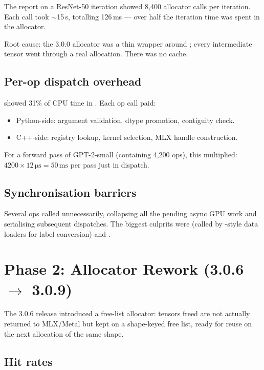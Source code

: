The  report on a ResNet-50 iteration
showed 8,400 allocator calls per iteration. Each call took
$\sim$15\,\textmu s, totalling 126\,ms --- over half the
iteration time was spent in the allocator.

Root cause: the 3.0.0 allocator was a thin wrapper around
; every intermediate tensor went through a real
allocation. There was no cache.

\subsection{Per-op dispatch overhead}
\label{ssec:stabilization:dispatch_overhead}

 showed 31\% of CPU time in
. Each op call paid:
\begin{itemize}
  \item Python-side: argument validation, dtype promotion,
    contiguity check.
  \item C++-side: registry lookup, kernel selection, MLX
    handle construction.
\end{itemize}

For a forward pass of GPT-2-small (containing 4,200 ops), this
multiplied: $4200 \times 12\,\mathrm{\mu s} = 50\,\mathrm{ms}$
per pass just in dispatch.

\subsection{Synchronisation barriers}
\label{ssec:stabilization:sync_barriers}

Several ops called  unnecessarily,
collapsing all the pending async GPU work and serialising
subsequent dispatches. The biggest culprits were
 (called by -style data
loaders for label conversion) and .

\section{Phase 2: Allocator Rework (3.0.6 $\to$ 3.0.9)}
\label{sec:stabilization:phase_2}

The 3.0.6 release introduced a free-list allocator: tensors
freed are not actually returned to MLX/Metal but kept on a
shape-keyed free list, ready for reuse on the next allocation
of the same shape.

\subsection{Hit rates}
\label{ssec:stabilization:hit_rates}

